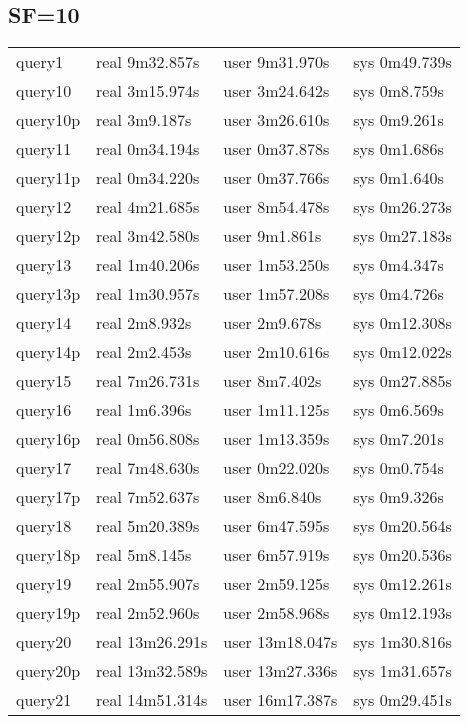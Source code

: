 \subsection{SF=10}
\begin{tabular}{p{}|p{}|p{}|p{}}
query1 & real 9m32.857s & user 9m31.970s & sys 0m49.739s\\
query10 & real 3m15.974s & user 3m24.642s & sys 0m8.759s\\
query10p & real 3m9.187s & user 3m26.610s & sys 0m9.261s\\
query11 & real 0m34.194s & user 0m37.878s & sys 0m1.686s\\
query11p & real 0m34.220s & user 0m37.766s & sys 0m1.640s\\
query12 & real 4m21.685s & user 8m54.478s & sys 0m26.273s\\
query12p & real 3m42.580s & user 9m1.861s & sys 0m27.183s\\
query13 & real 1m40.206s & user 1m53.250s & sys 0m4.347s\\
query13p & real 1m30.957s & user 1m57.208s & sys 0m4.726s\\
query14 & real 2m8.932s & user 2m9.678s & sys 0m12.308s\\
query14p & real 2m2.453s & user 2m10.616s & sys 0m12.022s\\
query15 & real 7m26.731s & user 8m7.402s & sys 0m27.885s\\
query16 & real 1m6.396s & user 1m11.125s & sys 0m6.569s\\
query16p & real 0m56.808s & user 1m13.359s & sys 0m7.201s\\
query17 & real 7m48.630s & user 0m22.020s & sys 0m0.754s\\
query17p & real 7m52.637s & user 8m6.840s & sys 0m9.326s\\
query18 & real 5m20.389s & user 6m47.595s & sys 0m20.564s\\
query18p & real 5m8.145s & user 6m57.919s & sys 0m20.536s\\
query19 & real 2m55.907s & user 2m59.125s & sys 0m12.261s\\
query19p & real 2m52.960s & user 2m58.968s & sys 0m12.193s\\
query20 & real 13m26.291s & user 13m18.047s & sys 1m30.816s\\
query20p & real 13m32.589s & user 13m27.336s & sys 1m31.657s\\
query21 & real 14m51.314s & user 16m17.387s & sys 0m29.451s\\

\end{tabular}
